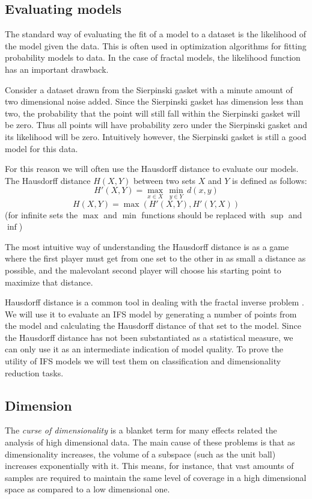 \documentclass[10pt,a4paper,oneside]{article}
\theoremstyle{definition}
\begin{document}
\subsection*{Evaluating models}

The standard way of evaluating the fit of a model to a dataset is the likelihood of the model given the data. This is often used in optimization algorithms for fitting probability models to data. In the case of fractal models, the likelihood function has an important drawback. 

Consider a dataset drawn from the Sierpinski gasket with a minute amount of two dimensional noise added. Since the Sierpinski gasket has dimension less than two, the probability that the point will still fall within the Sierpinski gasket will be zero. Thus all points will have probability zero under the Sierpinski gasket and its likelihood will be zero. Intuitively however, the Sierpinski gasket is still a good model for this data.

For this reason we will often use the Hausdorff distance to evaluate our models. The Hausdorff distance  $H(X, Y)$ between two sets $X$ and $Y$ is defined as follows:
\[ 
H'(X, Y) = \max_{x\in X} \, \min_{y\in Y} \, d(x, y) 
\]
\[
H(X, Y) = \max\left (H'(X, Y), H'(Y, X)\right )
\]
 (for infinite sets the $\max$ and $\min$ functions should be replaced with $\sup$ and $\inf$)
 
The most intuitive way of understanding the Hausdorff distance is as a game where the first player must get from one set to the other in as small a distance as possible, and the malevolant second player will choose his starting point to maximize that distance.

Hausdorff distance is a common tool in dealing with the fractal inverse problem \cite{nettleton1994evolutionary}. We will use it to evaluate an IFS model by generating a number of points from the model and calculating the Hausdorff distance of that set to the model. Since the Hausdorff distance has not been substantiated as a statistical measure, we can only use it as an intermediate indication of model quality. To prove the utility of IFS models we will test them on classification and dimensionality reduction tasks.

\subsection*{Dimension}

The \textit{curse of dimensionality} is a blanket term for many effects related the analysis of high dimensional data. The main cause of these problems is that as dimensionality increases, the volume of a subspace (such as the unit ball) increases exponentially with it. This means, for instance, that vast amounts of samples are required to maintain the same level of coverage in a high dimensional space as compared to a low dimensional one. 
\end{document}
